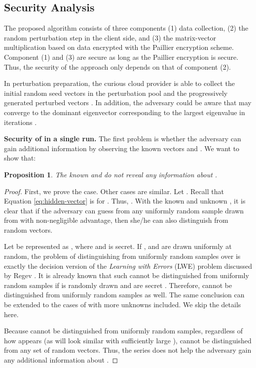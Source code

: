 \documentclass[10pt, conference, compsocconf]{IEEEtran}
\newtheorem{prop}[thm]{Proposition}
\begin{document}
\subsection{Security Analysis}
The proposed algorithm consists of three components (1) data collection, (2) the random perturbation step in the client side, and (3) the matrix-vector multiplication based on data encrypted with the Paillier encryption scheme. Component (1) and (3) are secure as long as the Paillier encryption is secure. 
Thus, the security of the approach only depends on that of component (2). 

In perturbation preparation, the curious cloud provider is able to collect the initial random seed vectors  in the perturbation pool and the progressively generated perturbed vectors . In addition, the adversary could be aware that  may converge to the dominant eigenvector corresponding to the largest eigenvalue in  iterations \cite{saad11}.

\textbf{Security of  in a single run.} The first problem is whether the adversary can gain additional information by observing the known vectors  and . We want to show that: 
\begin{prop}
The known  and  do not reveal any information about .   
\end{prop} 
\begin{proof}First, we prove the  case. Other cases are similar. 
Let . Recall that Equation \ref{eq:hidden-vector} is  for . Thus, . With the known  and unknown , it is clear that if the adversary can guess  from any uniformly random sample drawn from  with non-negligible advantage, then she/he can also distinguish  from random vectors. 

Let  be represented as , where  and  is secret. If ,  and  are drawn uniformly at random, the problem of distinguishing  from uniformly random samples over  is exactly the decision version of the \emph{Learning with Errors} (LWE) problem discussed by Regev \cite{regev05}. It is already known that such  cannot be distinguished from uniformly random samples if  is randomly drawn and  are secret \cite{regev05}. Therefore,  cannot be distinguished from uniformly random samples as well. The same conclusion can be extended to the cases of  with more unknowns included. We skip the details here.

Because  cannot be distinguished from uniformly random samples, regardless of how  appears (as  will look similar with sufficiently large ),  cannot be distinguished from any set of random vectors. Thus, the series  does not help the adversary gain any additional information about .  
\end{proof} 
\end{document}
